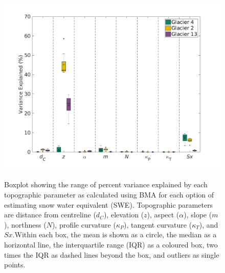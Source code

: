 \documentclass[12pt]{article}
\newcommand{\params}{Topographic parameters are distance from centreline ($d_C$), elevation ($z$), aspect ($\alpha$), slope ($m$), northness ($N$), profile curvature ($\kappa_P$), tangent curvature ($\kappa_T$), and $Sx$.}
\newcommand{\boxplot}{Within each box, the mean is shown as a circle, the median as a horizontal line, the interquartile range (IQR) as a coloured box, two times the IQR as dashed lines beyond the box, and outliers as single points.}
\begin{document}
\begin{figure}[H]
	\centering
	\includegraphics[width = 1.1 \textwidth]{BMSCoeffs_DensityOpts.png}\\
	\caption{Boxplot showing the range of percent variance explained by each topographic parameter as calculated using BMA for each option of estimating snow water equivalent (SWE). \params \boxplot}
	\label{fig:BMSPercentVar_densityOptions}
\end{figure} 
\end{document}
